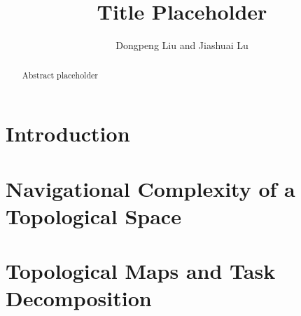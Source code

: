\documentclass[12pt,twoside]{article}
\begin{document}
\title{Title Placeholder}

\author{
Dongpeng Liu %
and Jiashuai Lu%
}


\maketitle

%
\begin{abstract}
Abstract placeholder
\end{abstract}

\setcounter{page}{0}

\section{Introduction}\label{sec:intro}


\section{Navigational Complexity of a Topological Space}\label{sec:complexity}

\section{Topological Maps and Task Decomposition}\label{sec:decomposition}




\end{document}
